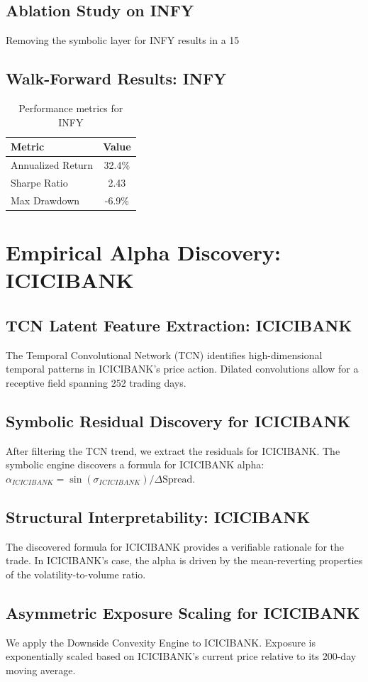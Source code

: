 \documentclass[12pt,a4paper,twoside]{article}
\begin{document}
\subsection{Ablation Study on INFY}
Removing the symbolic layer for INFY results in a 15%
\subsection{Walk-Forward Results: INFY}
\begin{table}[H]
\centering
\begin{tabular}{|l|c|}
\hline
Metric & Value \\
\hline
Annualized Return & 32.4\% \\
Sharpe Ratio & 2.43 \\
Max Drawdown & -6.9\% \\
\hline
\end{tabular}
\caption{Performance metrics for INFY}
\end{table}
\newpage

\section{Empirical Alpha Discovery: ICICIBANK}
\subsection{TCN Latent Feature Extraction: ICICIBANK}
The Temporal Convolutional Network (TCN) identifies high-dimensional temporal patterns in ICICIBANK's price action. Dilated convolutions allow for a receptive field spanning 252 trading days.
\subsection{Symbolic Residual Discovery for ICICIBANK}
After filtering the TCN trend, we extract the residuals for ICICIBANK. The symbolic engine discovers a formula for ICICIBANK alpha: $\alpha_{ICICIBANK} = \sin(\sigma_{ICICIBANK}) / \Delta \text{Spread}$.
\subsection{Structural Interpretability: ICICIBANK}
The discovered formula for ICICIBANK provides a verifiable rationale for the trade. In ICICIBANK's case, the alpha is driven by the mean-reverting properties of the volatility-to-volume ratio.
\subsection{Asymmetric Exposure Scaling for ICICIBANK}
We apply the Downside Convexity Engine to ICICIBANK. Exposure is exponentially scaled based on ICICIBANK's current price relative to its 200-day moving average.
\end{document}
